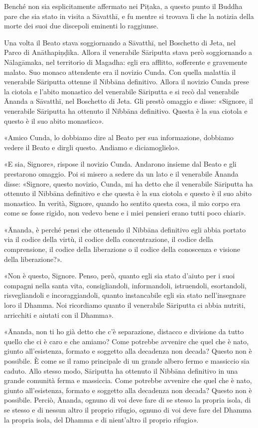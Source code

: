 
 Benché non sia esplicitamente affermato nei
Piṭaka, a questo punto il Buddha pare che sia stato in visita a Sāvatthī, e fu
mentre si trovava lì che la notizia della morte dei suoi due discepoli eminenti
lo raggiunse.

 Una volta il Beato stava soggiornando a Sāvatthī, nel
Boschetto di Jeta, nel Parco di Anāthapiṇḍika. Allora il venerabile Sāriputta
stava però soggiornando a Nālagāmaka, nel territorio di Magadha: egli era
afflitto, sofferente e gravemente malato. Suo monaco attendente era il novizio
Cunda. Con quella malattia il venerabile Sāriputta ottenne il Nibbāna
definitivo. Allora il novizio Cunda prese la ciotola e l’abito monastico del
venerabile Sāriputta e si recò dal venerabile Ānanda a Sāvatthī, nel Boschetto
di Jeta. Gli prestò omaggio e disse: «Signore, il venerabile Sāriputta ha
ottenuto il Nibbāna definitivo. Questa è la sua ciotola e questo è il suo abito
monastico».

«Amico Cunda, lo dobbiamo dire al Beato per sua informazione, dobbiamo vedere il
Beato e dirgli questo. Andiamo e diciamoglielo».

«E sia, Signore», rispose il novizio Cunda. Andarono insieme dal Beato e gli
prestarono omaggio. Poi si misero a sedere da un lato e il venerabile Ānanda
disse: «Signore, questo novizio, Cunda, mi ha detto che il venerabile Sāriputta
ha ottenuto il Nibbāna definitivo e che questa è la sua ciotola e questo è il
suo abito monastico. In verità, Signore, quando ho sentito questa cosa, il mio
corpo era come se fosse rigido, non vedevo bene e i miei pensieri erano tutti
poco chiari».

«Ānanda, è perché pensi che ottenendo il Nibbāna definitivo egli abbia portato
via il codice della virtù, il codice della concentrazione, il codice della
comprensione, il codice della liberazione o il codice della conoscenza e visione
della liberazione?».

«Non è questo, Signore. Penso, però, quanto egli sia stato d’aiuto per i suoi
compagni nella santa vita, consigliandoli, informandoli, istruendoli,
esortandoli, risvegliandoli e incoraggiandoli, quanto instancabile egli sia
stato nell’insegnare loro il Dhamma. Noi ricordiamo quanto il venerabile
Sāriputta ci abbia nutriti, arricchiti e aiutati con il Dhamma».

«Ānanda, non ti ho già detto che c’è separazione, distacco e divisione da tutto
quello che ci è caro e che amiamo? Come potrebbe avvenire che quel che è nato,
giunto all’esistenza, formato e soggetto alla decadenza non decada? Questo non è
possibile. È come se il ramo principale di un grande albero fermo e massiccio
sia caduto. Allo stesso modo, Sāriputta ha ottenuto il Nibbāna definitivo in una
grande comunità ferma e massiccia. Come potrebbe avvenire che quel che è nato,
giunto all’esistenza, formato e soggetto alla decadenza non decada? Questo non è
possibile. Perciò, Ānanda, ognuno di voi deve fare di se stesso la propria
isola, di se stesso e di nessun altro il proprio rifugio, ognuno di voi deve
fare del Dhamma la propria isola, del Dhamma e di nient’altro il proprio
rifugio».

